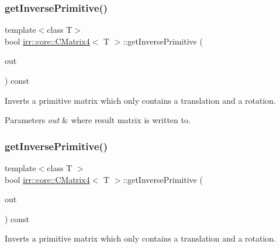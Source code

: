 \subsubsection{\texorpdfstring{get\+Inverse\+Primitive()}{getInversePrimitive()}\hspace{0.1cm}{\footnotesize\ttfamily [1/2]}}
{\footnotesize\ttfamily template$<$class T$>$ \\
bool \hyperlink{classirr_1_1core_1_1CMatrix4}{irr\+::core\+::\+C\+Matrix4}$<$ T $>$\+::get\+Inverse\+Primitive (\begin{DoxyParamCaption}\item[{\hyperlink{classirr_1_1core_1_1CMatrix4}{C\+Matrix4}$<$ T $>$ \&}]{out }\end{DoxyParamCaption}) const}



Inverts a primitive matrix which only contains a translation and a rotation. 


\begin{DoxyParams}{Parameters}
{\em out} & where result matrix is written to. \\
\hline
\end{DoxyParams}
\mbox{\label{classirr_1_1core_1_1CMatrix4_aaeab6a8672ecc3d9790c8e7f141db795}} 
\subsubsection{\texorpdfstring{get\+Inverse\+Primitive()}{getInversePrimitive()}\hspace{0.1cm}{\footnotesize\ttfamily [2/2]}}
{\footnotesize\ttfamily template$<$class T $>$ \\
bool \hyperlink{classirr_1_1core_1_1CMatrix4}{irr\+::core\+::\+C\+Matrix4}$<$ T $>$\+::get\+Inverse\+Primitive (\begin{DoxyParamCaption}\item[{\hyperlink{classirr_1_1core_1_1CMatrix4}{C\+Matrix4}$<$ T $>$ \&}]{out }\end{DoxyParamCaption}) const\hspace{0.3cm}{\ttfamily [inline]}}



Inverts a primitive matrix which only contains a translation and a rotation. 


